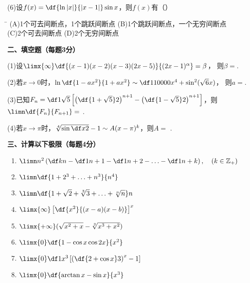 (6)\;设$f(x)=\df{\ln|x|}{|x-1|}\sin x$，则$f(x)$有（\quad）%

\begin{tabbing}
	\hspace{8cm}\=\kill
	\quad\quad\quad(A)\;1个可去间断点，1个跳跃间断点 
	\> (B)\;1个跳跃间断点，一个无穷间断点 \\ 
	\quad\quad\quad(C)\;2个可去间断点
	\>	(D)\;2个无穷间断点 
\end{tabbing}

{\bf 二、填空题（每题3分）}

(1)\;设$\limx{\infty}\df{(x-1)(x-2)(x-3)(2x-5)}{(2x-1)^{\alpha}}=\beta$，
则$\beta=$\underline{\hspace{4cm}}.

(2)\;若$x\to0$时，$\ln\df{1-ax^2}{1+ax^2}\sim\df1{10000}x^4+\sin^2(\sqrt6x)$，
则$a=$\underline{\hspace{4cm}}.

(3)\;已知$F_n=\df1{\sqrt5}\left[\left(\df{1+\sqrt5}2\right)^{n+1}
-\left(\df{1-\sqrt5}2\right)^{n+1}\right]$，则$\limn\df{F_n}{F_{n+1}}=$
\underline{\hspace{4cm}}.

(4)\;若$x\to\pi$时，$\sqrt[4]{\sin\df x2}-1\sim A(x-\pi)^k$，则$A=$
\underline{\hspace{4cm}}.

\bigskip

{\bf 三、计算以下极限（每题4分）}
\begin{enumerate}[(1)]
  \setlength{\itemindent}{1cm}
  \item $\limn n^2\left(\df
  kn-\df1{n+1}-\df1{n+2}-\ldots-\df1{n+k}\right),\quad(k\in\mathbb{Z}_+)$
  \item $\limn\df{1+2^3+\ldots+n^3}{n^4}$
  \item $\limn\df{1+\sqrt2+\sqrt[3]3+\ldots+\sqrt[n]n}n$
  \item $\limx{\infty}\left[\df{x^2}{(x-a)(x-b)}\right]^x$
  \item $\limx{+\infty}(\sqrt{x^2+x}-\sqrt[3]{x^3+x^2})$ 
  \item $\limx{0}\df{1-\cos x\cos 2x}{x^2}$
  \item $\limx{0}\df1{x^3}\left[\left(\df{2+\cos x}3\right)^x-1\right]$
  \item $\limx{0}\df{\arctan x-\sin x}{x^3}$
\end{enumerate}

